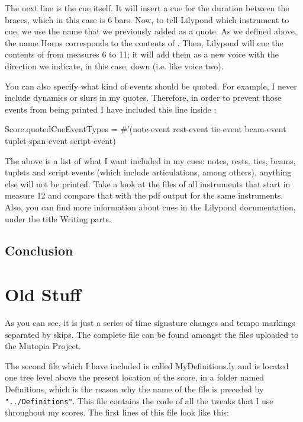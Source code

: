 \documentclass[../../LilyPond-Tutorials]{subfiles}
\begin{document}
The next line is the cue itself.
It will insert a cue for the duration between the braces, which in this case is 6 bars.
Now, to tell Lilypond which instrument to cue, we use the name that we previously added as a quote.
As we defined above, the name Horns corresponds to the contents of .
Then, Lilypond will cue the contents of  from measures 6 to 11; it will add them as a new voice with the direction we indicate, in this case, down (i.e. like voice two).

You can also specify what kind of events should be quoted.
For example, I never include dynamics or slurs in my quotes.
Therefore, in order to prevent those events from being printed I have included this line inside :

\begin{lilypondcode}
\set Score.quotedCueEventTypes = 
  #'(note-event rest-event tie-event beam-event tuplet-span-event script-event)
\end{lilypondcode}

The above is a list of what I want included in my cues: notes, rests, ties, beams, tuplets and script events (which include articulations, among others), anything else will not be printed.
Take a look at the files of all instruments that start in measure 12 and compare that with the pdf output for the same instruments.
Also, you can find more information about cues in the Lilypond documentation, under the title Writing parts.

\section{Conclusion}


\chapter{Old Stuff}

As you can see, it is just a series of time signature changes and tempo markings separated by skips. 
The complete file can be found amongst the files uploaded to the Mutopia Project.

The second file which I have included is called MyDefinitions.ly and is located one tree level above the present location of the score, in a folder named Definitions, which is the reason why the name of the file is preceded by \verb|"../Definitions"|.
This file contains the code of all the tweaks that I use throughout my scores. 
The first lines of this file look like this:
\end{document}
